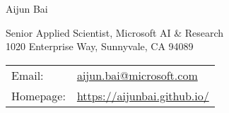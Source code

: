 \documentclass[letterpaper,10pt]{article}
\def\name{Aijun Bai}
\begin{document}
\begin{flushleft}
	{\huge \name}
\end{flushleft}

\bigskip

\begin{minipage}{0.5\textwidth}
	Senior Applied Scientist, Microsoft AI \& Research \\
	1020 Enterprise Way, Sunnyvale, CA 94089
\end{minipage}
\begin{minipage}{0.5\textwidth}
	\begin{tabular}{ll}
		Email:    & \href{mailto:aijun.bai@microsoft.com}{\rm aijun.bai@microsoft.com} \\
		Homepage: & \url{https://aijunbai.github.io/} \\
	\end{tabular}
\end{minipage}

\vspace{15pt}
\end{document}
